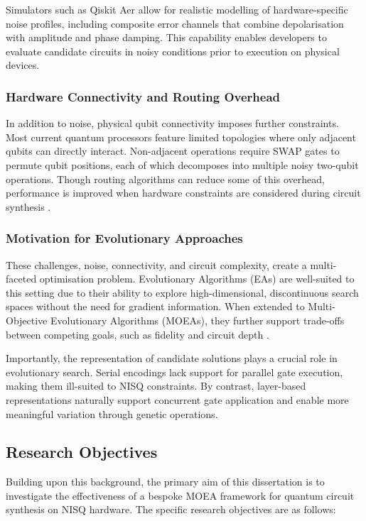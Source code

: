 \documentclass[11pt,a4paper]{article}
\begin{document}
Simulators such as Qiskit Aer allow for realistic modelling of hardware-specific noise profiles, including composite error channels that combine depolarisation with amplitude and phase damping. This capability enables developers to evaluate candidate circuits in noisy conditions prior to execution on physical devices.

\subsubsection*{Hardware Connectivity and Routing Overhead}
In addition to noise, physical qubit connectivity imposes further constraints. Most current quantum processors feature limited topologies where only adjacent qubits can directly interact. Non-adjacent operations require SWAP gates to permute qubit positions, each of which decomposes into multiple noisy two-qubit operations. Though routing algorithms can reduce some of this overhead, performance is improved when hardware constraints are considered during circuit synthesis \cite{Pedram2016Layout}.

\subsubsection*{Motivation for Evolutionary Approaches}
These challenges, noise, connectivity, and circuit complexity, create a multi-faceted optimisation problem. Evolutionary Algorithms (EAs) are well-suited to this setting due to their ability to explore high-dimensional, discontinuous search spaces without the need for gradient information. When extended to Multi-Objective Evolutionary Algorithms (MOEAs), they further support trade-offs between competing goals, such as fidelity and circuit depth \cite{moein, Zhou2011MOEAsSurvey}.\newline

Importantly, the representation of candidate solutions plays a crucial role in evolutionary search. Serial encodings lack support for parallel gate execution, making them ill-suited to NISQ constraints. By contrast, layer-based representations naturally support concurrent gate application and enable more meaningful variation through genetic operations.

\subsection{Research Objectives}
Building upon this background, the primary aim of this dissertation is to investigate the effectiveness of a bespoke MOEA framework for quantum circuit synthesis on NISQ hardware. The specific research objectives are as follows:
\end{document}
